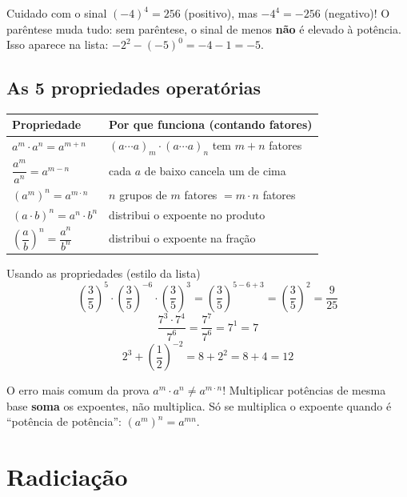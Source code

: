 \documentclass[12pt,a4paper]{article}
\begin{document}
\begin{atencao}{Cuidado com o sinal}
$(-4)^4 = 256$ (positivo), mas $-4^4 = -256$ (negativo)! O parêntese muda
tudo: sem parêntese, o sinal de menos \textbf{não} é elevado à potência.
Isso aparece na lista: $-2^2-(-5)^0 = -4 - 1 = -5$.
\end{atencao}

\subsection{As 5 propriedades operatórias}

\begin{center}
\renewcommand{\arraystretch}{1.6}
\begin{tabular}{@{}ll@{}}
\toprule
\textbf{Propriedade} & \textbf{Por que funciona (contando fatores)} \\
\midrule
$a^m \cdot a^n = a^{m+n}$ & $(a\cdots a)_{m} \cdot (a \cdots a)_n$ tem $m+n$ fatores \\
$\dfrac{a^m}{a^n} = a^{m-n}$ & cada $a$ de baixo cancela um de cima \\
$(a^m)^n = a^{m\cdot n}$ & $n$ grupos de $m$ fatores $= m\cdot n$ fatores \\
$(a\cdot b)^n = a^n \cdot b^n$ & distribui o expoente no produto \\
$\left(\dfrac{a}{b}\right)^n = \dfrac{a^n}{b^n}$ & distribui o expoente na fração \\
\bottomrule
\end{tabular}
\end{center}

\begin{exemplo}{Usando as propriedades (estilo da lista)}
\[
\left(\frac35\right)^5\cdot\left(\frac35\right)^{-6}\cdot\left(\frac35\right)^3
= \left(\frac35\right)^{5-6+3} = \left(\frac35\right)^{2} = \frac{9}{25}
\]
\[
\frac{7^3\cdot 7^4}{7^6} = \frac{7^{7}}{7^{6}} = 7^{1} = 7
\]
\[
2^3+\left(\frac12\right)^{-2} = 8 + 2^2 = 8+4=12
\]
\end{exemplo}

\begin{atencao}{O erro mais comum da prova}
$a^m \cdot a^n \neq a^{m\cdot n}$! Multiplicar potências de mesma base
\textbf{soma} os expoentes, não multiplica. Só se multiplica o expoente
quando é ``potência de potência'': $(a^m)^n = a^{mn}$.
\end{atencao}

\section{Radiciação}
\end{document}
